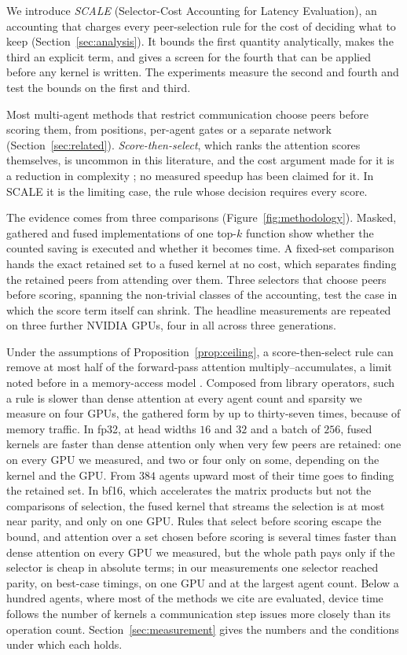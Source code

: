 We introduce \emph{SCALE} (Selector-Cost Accounting for Latency Evaluation), an
accounting that charges every peer-selection rule for the cost of deciding what
to keep (Section~\ref{sec:analysis}). It bounds the first quantity analytically,
makes the third an explicit term, and gives a screen for the fourth that can be applied before any
kernel is written. The experiments measure the second and fourth and test the
bounds on the first and third.

Most multi-agent methods that restrict communication choose peers before
scoring them, from positions, per-agent gates or a separate network
(Section~\ref{sec:related}). \emph{Score-then-select}, which ranks the attention
scores themselves, is uncommon in this literature, and the cost argument made for
it is a reduction in complexity \citep{sun2020sparsecomm}; no measured speedup
has been claimed for it. In SCALE it is the limiting case, the rule whose decision
requires every score.

The evidence comes from three comparisons (Figure~\ref{fig:methodology}).
Masked, gathered and fused implementations of one top-$k$ function show whether
the counted saving is executed and whether it becomes time. A fixed-set
comparison hands the exact retained set to a fused kernel at no cost, which
separates finding the retained peers from attending over them. Three selectors
that choose peers before scoring, spanning the non-trivial classes of the
accounting,
test the case in which the score term itself can shrink. The headline
measurements are repeated on three further NVIDIA GPUs, four in all across three
generations.

Under the assumptions of Proposition~\ref{prop:ceiling}, a score-then-select
rule can remove at most half of the forward-pass attention
multiply--accumulates, a limit noted before in a
memory-access model \citep{chen2023dfss}. Composed from library operators, such
a rule is slower than dense attention at every agent count and sparsity we
measure on four GPUs, the gathered form by up to thirty-seven times, because of
memory traffic. In fp32, at head widths $16$ and $32$ and a batch of $256$,
fused kernels are faster than dense attention only when very few peers are
retained: one on every GPU we measured, and two or four only
on some, depending on the kernel and the GPU. From $384$ agents upward most of
their time goes to finding the retained set. In bf16, which accelerates the
matrix products but not the comparisons of selection, the fused kernel that
streams the selection is at most near parity, and only on one GPU. Rules that select before scoring escape the bound,
and attention over a set chosen before scoring is several times faster than dense
attention on every GPU we measured, but the whole path pays only if the selector
is cheap in absolute terms; in our measurements one selector reached parity,
on best-case timings, on one GPU and at the largest agent count. Below a hundred agents, where most of
the methods we cite are evaluated, device time follows the number of kernels a
communication step issues more closely than its operation count.
Section~\ref{sec:measurement} gives the numbers and the conditions under which
each holds.

